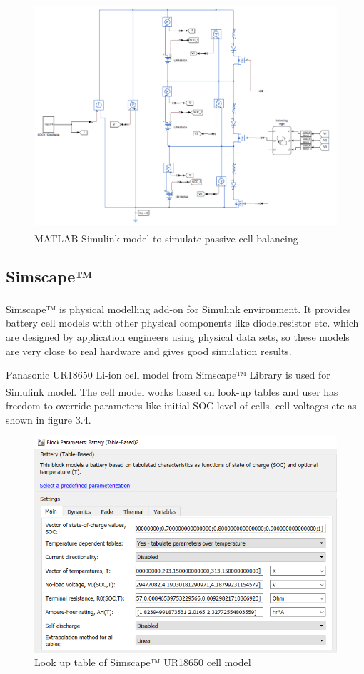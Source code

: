 \begin{figure}[h!]
    \centering
    \includegraphics[scale = 0.6]{Chapter3/Figures/mainmodel.PNG}
    \caption{MATLAB\textsuperscript{\textregistered}-Simulink\textsuperscript{\textregistered} model to simulate passive cell balancing}
\end{figure}

\subsection{Simscape™}
Simscape™ is physical modelling add-on for Simulink\textsuperscript{\textregistered} environment. It provides battery cell models with other physical components like diode,resistor etc. which are designed by application engineers using physical data sets, so these models are very close to real hardware and gives good simulation results.

Panasonic UR18650 Li-ion cell model from Simscape™ Library is used for Simulink\textsuperscript{\textregistered} model. The cell model works based on look-up tables and user has freedom to override parameters like initial SOC level of cells, cell voltages etc as shown in figure 3.4.

\begin{figure}[h!]
    \centering
    \includegraphics[scale = 0.72]{Chapter3/Figures/battery_model.PNG}
    \caption{Look up table of Simscape™ UR18650 cell model }
\end{figure}


